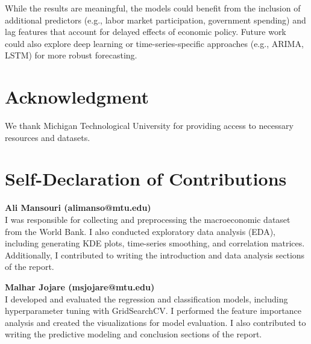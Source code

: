 \documentclass[conference]{IEEEtran}
\begin{document}
While the results are meaningful, the models could benefit from the inclusion of additional predictors (e.g., labor market participation, government spending) and lag features that account for delayed effects of economic policy. Future work could also explore deep learning or time-series-specific approaches (e.g., ARIMA, LSTM) for more robust forecasting.

\section*{Acknowledgment}
We thank Michigan Technological University for providing access to necessary resources and datasets.



\section*{Self-Declaration of Contributions}

\textbf{Ali Mansouri (alimanso@mtu.edu)}\\
I was responsible for collecting and preprocessing the macroeconomic dataset from the World Bank. I also conducted exploratory data analysis (EDA), including generating KDE plots, time-series smoothing, and correlation matrices. Additionally, I contributed to writing the introduction and data analysis sections of the report.

\vspace{1em}

\textbf{Malhar Jojare (msjojare@mtu.edu)}\\
I developed and evaluated the regression and classification models, including hyperparameter tuning with GridSearchCV. I performed the feature importance analysis and created the visualizations for model evaluation. I also contributed to writing the predictive modeling and conclusion sections of the report.
\end{document}
